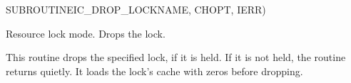 \begin{routine} %
\subroutine
   {SUBROUTINE}{IC\_DROP\_LOCK}{NAME, CHOPT, IERR)}
\begin{overview}
Resource lock mode. Drops the lock.

\end{overview}
\begin{argdeflist}
\end{argdeflist}
\begin{describe}

This routine drops the specified lock, if it is held. If it is not held,
the routine returns quietly. It loads the lock's cache with zeros before
dropping.

\end{describe}
\begin{options}
\end{options}
\begin{returncodes}
\end{returncodes}
\end{routine}

